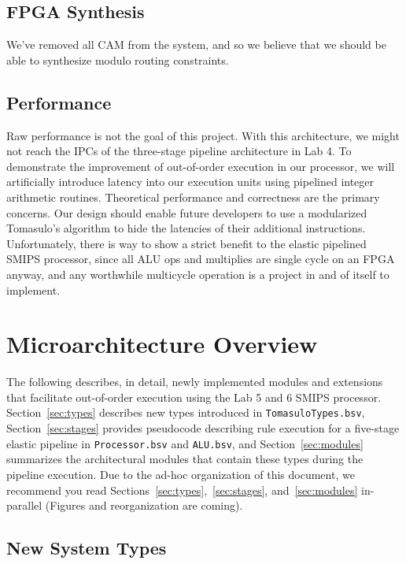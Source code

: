 \documentclass[12pt]{article}
\begin{document}
\subsection{FPGA Synthesis}
We've removed all CAM from the system, and so we believe that we should be able to 
synthesize modulo routing constraints.

\subsection{Performance}
Raw performance is not the goal of this project. With this architecture, we might not 
reach the IPCs of the three-stage pipeline architecture in Lab 4. To demonstrate the 
improvement of out-of-order execution in our processor, we will artificially introduce 
latency into our execution units using pipelined integer arithmetic routines. Theoretical 
performance and correctness are the primary concerns. Our design 
should enable future developers to use  a modularized Tomasulo's algorithm to hide the 
latencies of their additional instructions.
Unfortunately, there is way to show a strict benefit to the elastic pipelined SMIPS 
processor, since all ALU ops and multiplies  are single cycle on an FPGA anyway, and any 
worthwhile multicycle operation is a project in and of itself to implement.


\section{Microarchitecture Overview}

The following describes, in detail, newly implemented modules and extensions that facilitate out-of-order 
execution using the Lab 5 and 6 SMIPS processor. Section~\ref{sec:types} describes new types introduced
in \verb=TomasuloTypes.bsv=, Section~\ref{sec:stages} provides pseudocode describing rule execution for 
a five-stage elastic pipeline in \verb=Processor.bsv= and \verb=ALU.bsv=, and Section~\ref{sec:modules} summarizes 
the architectural modules that contain these types during the pipeline execution. Due to the ad-hoc 
organization of this document, we recommend you read Sections~\ref{sec:types},~\ref{sec:stages}, 
and~\ref{sec:modules} in-parallel (Figures and reorganization are coming). 

\subsection{New System Types\label{sec:types}}
\end{document}
